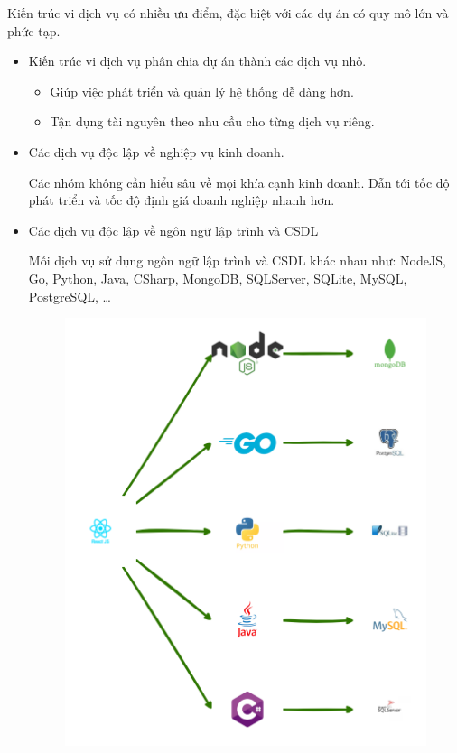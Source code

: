 Kiến trúc vi dịch vụ có nhiều ưu điểm, đặc biệt với các dự án có quy mô lớn và phức tạp.

\begin{itemize}

\item Kiến trúc vi dịch vụ phân chia dự án thành các dịch vụ nhỏ.

\begin{itemize}

\item Giúp việc phát triển và quản lý hệ thống dễ dàng hơn.

\item Tận dụng tài nguyên theo nhu cầu cho từng dịch vụ riêng.

\end{itemize}

\item Các dịch vụ độc lập về nghiệp vụ kinh doanh.

Các nhóm không cần hiểu sâu về mọi khía cạnh kinh doanh. Dẫn tới tốc độ phát triển và tốc độ định giá doanh nghiệp nhanh hơn.

\item Các dịch vụ độc lập về ngôn ngữ lập trình và CSDL

\begin{example} Mỗi dịch vụ sử dụng ngôn ngữ lập trình và CSDL khác nhau như: NodeJS, Go, Python, Java, CSharp, MongoDB, SQLServer, SQLite, MySQL, PostgreSQL, \dots

\end{example}

\begin{figure}[H]

\centering

\includegraphics[scale = 0.3]{pictures/_da_ngon_ngu_va_csdl/main.drawio.png}


\end{figure}
\end{itemize}
